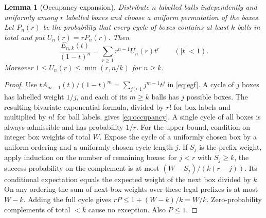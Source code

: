 \documentclass[11pt,reqno]{amsart}
\newtheorem{lemma}[theorem]{Lemma}
\theoremstyle{remark}
\begin{document}
\begin{lemma}[Occupancy expansion]\label{lem:occupancy}
Distribute $n$ labelled balls independently and uniformly among $r$ labelled boxes and choose a uniform permutation of the boxes. Let $P_n(r)$ be the probability that every cycle of boxes contains at least $k$ balls in total and put $U_n(r)=rP_n(r)$. Then
\begin{equation}\label{eq:occupancy}
 \frac{E_{n,k}(t)}{(1-t)^n}=\sum_{r\ge1}r^{n-1}U_n(r)t^r
 \qquad(|t|<1).
\end{equation}
Moreover $1\le U_n(r)\le\min(r,n/k)$ for $n\ge k$.
\end{lemma}
\begin{proof}
Use $tA_{m-1}(t)/(1-t)^m=\sum_{j\ge1}j^{m-1}t^j$ in \eqref{eq:egf}. A cycle of $j$ boxes has labelled weight $1/j$, and each of its $m\ge k$ balls has $j$ possible boxes. The resulting bivariate exponential formula, divided by $r!$ for box labels and multiplied by $n!$ for ball labels, gives \eqref{eq:occupancy}. A single cycle of all boxes is always admissible and has probability $1/r$. For the upper bound, condition on integer box weights of total $W$. Expose the cycle of a uniformly chosen box by a uniform ordering and a uniformly chosen cycle length $j$. If $S_j$ is the prefix weight, apply induction on the number of remaining boxes: for $j<r$ with $S_j\ge k$, the success probability on the complement is at most $(W-S_j)/(k(r-j))$. Its conditional expectation equals the expected weight of the next box divided by $k$. On any ordering the sum of next-box weights over these legal prefixes is at most $W-k$. Adding the full cycle gives $rP\le1+(W-k)/k=W/k$. Zero-probability complements of total $<k$ cause no exception. Also $P\le1$.
\end{proof}
\end{document}
